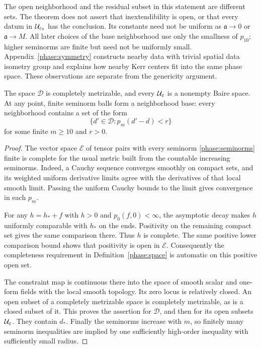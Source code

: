 The open neighborhood and the residual subset in this statement
are different sets. The theorem does not assert that inextendibility
is open, or that every datum in \(\mathcal U_{\varepsilon_0}\) has the
conclusion. Its constants need not be uniform as
\(\mathfrak a\to0\) or \(\mathfrak a\to M\).
All later choices of the base neighborhood use only the smallness of
\(p_{10}\); higher seminorms are finite but need not be uniformly small.
Appendix~\ref{phase:symmetry} constructs nearby data with trivial spatial
data isometry group and explains how nearby Kerr centers fit into the
same phase space. These observations are separate from the genericity
argument.

\begin{lemma}
\label{phase:baire}
The space \(\mathcal D\) is completely metrizable, and every
\(\mathcal U_\varepsilon\) is a nonempty Baire space. At any point, finite
seminorm balls form a neighborhood base: every neighborhood contains
a set of the form
\[
 \{d'\in\mathcal D:p_m(d'-d)<r\}
\]
for some finite \(m\ge10\) and \(r>0\).
\end{lemma}

\begin{proof}
The vector space \(\mathcal E\) of tensor pairs with every seminorm
\eqref{phase:seminorms} finite is complete for the usual metric built
from the countable increasing seminorms. Indeed, a Cauchy sequence
converges smoothly on compact sets, and its weighted uniform
derivative limits agree with the derivatives of that local smooth
limit. Passing the uniform Cauchy bounds to the limit gives
convergence in each \(p_m\).

For any \(h=h_*+f\) with \(h>0\) and \(p_0(f,0)<\infty\), the
asymptotic decay makes \(h\) uniformly comparable with \(h_*\) on
the ends. Positivity on the remaining compact set gives the same
comparison there. Thus \(h\) is complete. The same positive lower
comparison bound shows that positivity is open in \(\mathcal E\).
Consequently the completeness requirement in Definition~\ref{phase:space}
is automatic on this positive open set.

The constraint map is continuous there into the space of smooth
scalar and one-form fields with the local smooth topology.
Its zero locus is relatively closed. An open subset of a completely
metrizable space is completely metrizable, as is a closed subset
of it. This proves the assertion for \(\mathcal D\), and then for
its open subsets \(\mathcal U_\varepsilon\). They contain \(d_*\).
Finally the seminorms increase with \(m\), so finitely many
seminorm inequalities are implied by one sufficiently high-order
inequality with sufficiently small radius.
\end{proof}

